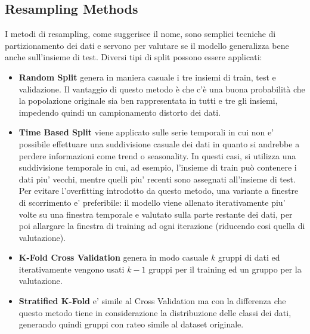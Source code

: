 \subsection{Resampling Methods}
I metodi di resampling, come suggerisce il nome, sono semplici tecniche di partizionamento dei dati e servono per valutare se il modello generalizza bene anche sull'insieme di test. Diversi tipi di split possono essere applicati:
\begin{itemize}
\item \textbf{Random Split} genera in maniera casuale i tre insiemi di train, test e validazione. Il vantaggio di questo metodo è che c'è una buona probabilità che la popolazione originale sia ben rappresentata in tutti e tre gli insiemi, impedendo quindi un campionamento distorto dei dati.
\item \textbf{Time Based Split} viene applicato sulle serie temporali in cui non e' possibile effettuare una suddivisione casuale dei dati in quanto si andrebbe a perdere informazioni come trend o seasonality. 
In questi casi, si utilizza una suddivisione temporale in cui, ad esempio, l'insieme di train può contenere i dati piu' vecchi, mentre quelli piu' recenti sono assegnati all'insieme di test. Per evitare l'overfitting introdotto da questo metodo, una variante a finestre di scorrimento e' preferibile: il modello viene allenato iterativamente piu' volte su una finestra temporale e valutato sulla parte restante dei dati, per poi allargare la finestra di training ad ogni iterazione (riducendo cosi quella di valutazione).
\item \textbf{K-Fold Cross Validation} genera in modo casuale $k$ gruppi di dati ed iterativamente vengono usati $k-1$ gruppi per il training ed un gruppo per la valutazione.
\item \textbf{Stratified K-Fold} e' simile al Cross Validation ma con la differenza che questo metodo tiene in considerazione la distribuzione delle classi dei dati, generando quindi gruppi con rateo simile al dataset originale.
\end{itemize}

